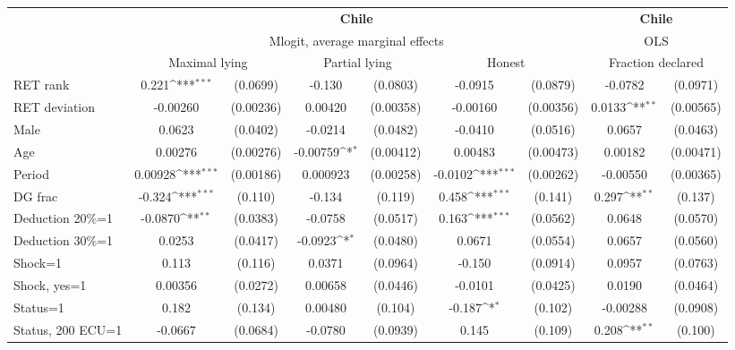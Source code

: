 \def\sym#1{\ifmmode^{#1}\else\(^{#1}\)\fi}
\begin{tabular}{l|cccccc|cc}
\hline\hline
&\multicolumn{6}{c|}{\bf Chile}&\multicolumn{2}{c}{\bf Chile}\\ &\multicolumn{6}{c|}{Mlogit, average marginal effects }&\multicolumn{2}{c}{OLS}\\
                &\multicolumn{2}{c}{Maximal lying}&\multicolumn{2}{c}{Partial lying}&\multicolumn{2}{c}{Honest}  &\multicolumn{2}{c}{Fraction declared}\\
\hline
RET rank        &    0.221\sym{***}& (0.0699)&   -0.130         & (0.0803)&  -0.0915         & (0.0879)&  -0.0782         & (0.0971)\\
RET deviation   & -0.00260         &(0.00236)&  0.00420         &(0.00358)& -0.00160         &(0.00356)&   0.0133\sym{**} &(0.00565)\\
Male            &   0.0623         & (0.0402)&  -0.0214         & (0.0482)&  -0.0410         & (0.0516)&   0.0657         & (0.0463)\\
Age             &  0.00276         &(0.00276)& -0.00759\sym{*}  &(0.00412)&  0.00483         &(0.00473)&  0.00182         &(0.00471)\\
Period          &  0.00928\sym{***}&(0.00186)& 0.000923         &(0.00258)&  -0.0102\sym{***}&(0.00262)& -0.00550         &(0.00365)\\
DG frac         &   -0.324\sym{***}&  (0.110)&   -0.134         &  (0.119)&    0.458\sym{***}&  (0.141)&    0.297\sym{**} &  (0.137)\\
Deduction 20\%=1&  -0.0870\sym{**} & (0.0383)&  -0.0758         & (0.0517)&    0.163\sym{***}& (0.0562)&   0.0648         & (0.0570)\\
Deduction 30\%=1&   0.0253         & (0.0417)&  -0.0923\sym{*}  & (0.0480)&   0.0671         & (0.0554)&   0.0657         & (0.0560)\\
Shock=1         &    0.113         &  (0.116)&   0.0371         & (0.0964)&   -0.150         & (0.0914)&   0.0957         & (0.0763)\\
Shock, yes=1    &  0.00356         & (0.0272)&  0.00658         & (0.0446)&  -0.0101         & (0.0425)&   0.0190         & (0.0464)\\
Status=1        &    0.182         &  (0.134)&  0.00480         &  (0.104)&   -0.187\sym{*}  &  (0.102)& -0.00288         & (0.0908)\\
Status, 200 ECU=1&  -0.0667         & (0.0684)&  -0.0780         & (0.0939)&    0.145         &  (0.109)&    0.208\sym{**} &  (0.100)\\

\end{tabular}

